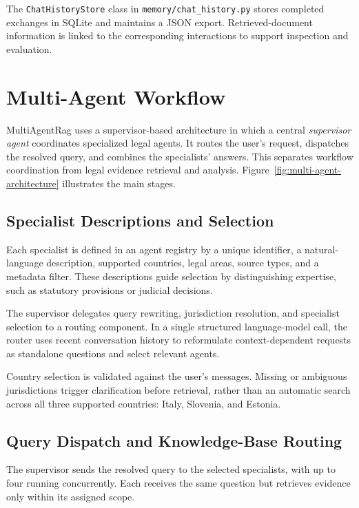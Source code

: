 \documentclass[a4paper,12pt]{report}
\begin{document}
The \texttt{ChatHistoryStore} class in
\texttt{memory/chat\_history.py} stores completed exchanges in
SQLite and maintains a JSON export. Retrieved-document information
is linked to the corresponding interactions to support inspection
and evaluation.







\section{Multi-Agent Workflow}
\label{sec:multi_agent_workflow}
MultiAgentRag uses a supervisor-based architecture in which a central
\emph{supervisor agent} coordinates specialized legal agents. It routes
the user's request, dispatches the resolved query, and combines the
specialists' answers. This separates workflow coordination from legal
evidence retrieval and analysis.
Figure~\ref{fig:multi-agent-architecture} illustrates the main stages.

\subsection{Specialist Descriptions and Selection}

Each specialist is defined in an agent registry by a unique identifier,
a natural-language description, supported countries, legal areas,
source types, and a metadata filter. These descriptions guide selection
by distinguishing expertise, such as statutory provisions or judicial
decisions.

The supervisor delegates query rewriting, jurisdiction resolution, and
specialist selection to a routing component. In a single structured
language-model call, the router uses recent conversation history to
reformulate context-dependent requests as standalone questions and
select relevant agents.

Country selection is validated against the user's messages. Missing
or ambiguous jurisdictions trigger clarification before retrieval,
rather than an automatic search across all three supported countries:
Italy, Slovenia, and Estonia.

\subsection{Query Dispatch and Knowledge-Base Routing}

The supervisor sends the resolved query to the selected specialists,
with up to four running concurrently. Each receives the same question
but retrieves evidence only within its assigned scope.
\end{document}
